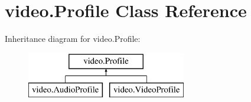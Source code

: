 \hypertarget{classvideo_1_1_profile}{
\section{video.Profile Class Reference}
\label{classvideo_1_1_profile}
}
Inheritance diagram for video.Profile:\begin{figure}[H]
\begin{center}
\leavevmode
\includegraphics[height=2.000000cm]{classvideo_1_1_profile}
\end{center}
\end{figure}
